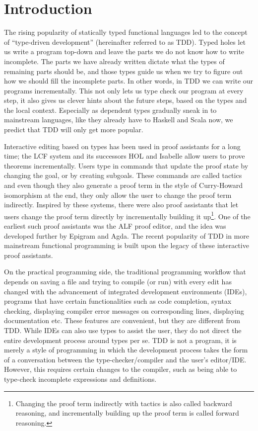 \section{Introduction} \label{sec:introduction}

The rising popularity of statically typed functional languages led to
the concept of ``type-driven development'' (hereinafter referred to as TDD).
Typed holes let us write a program top-down and leave the parts we do not know
how to write incomplete. The parts we have already written dictate what the
types of remaining parts should be, and those types guide us when we try to
figure out how we should fill the incomplete parts.
In other words, in TDD we can write our programs incrementally. This not only
lets us type check our program at every step, it also gives us clever
hints about the future steps, based on the types and the local context.
Especially as dependent types gradually sneak in to mainstream languages, like
they already have to Haskell\cite{eisenberg} and Scala\cite{scalaDep} now, we
predict that TDD will only get more popular.

Interactive editing based on types has been used in proof assistants for a long
time; the LCF system\cite{lcf} and its successors HOL and
Isabelle\cite{isabelle} allow users to prove theorems
incrementally. Users type in commands that update the proof state by
changing the goal, or by creating subgoals. These commands are called
tactics and even though they also generate a proof term in the style
of Curry-Howard isomorphism at the end, they only allow the user to change the
proof term indirectly.
Inspired by these systems, there were also proof assistants that let users
change the proof term directly by incrementally building it
up\footnote{Changing the proof term indirectly with tactics is also called
backward reasoning, and incrementally building up the proof term is called
forward reasoning.}. One of the earliest such proof assistants was the ALF proof
editor\cite{ALF}, and the idea was developed further by Epigram\cite{epigram}
and Agda\cite{agda}.  The recent popularity of TDD in more mainstream
functional programming is built upon the legacy of these interactive proof
assistants.

On the practical programming side, the traditional programming
workflow that depends on saving a file and trying to compile (or run) with
every edit has changed with the advancement of integrated development environments (IDEs),
programs that have certain functionalities such as code completion, syntax
checking, displaying compiler error messages on corresponding lines, displaying
documentation etc. These features are convenient, but they are different from
TDD. While IDEs can also use types to assist the user, they do not direct the
entire development process around types per se. TDD is not a program, it is
merely a style of programming in which the development process takes the form
of a conversation between the type-checker/compiler and the user's editor/IDE.
However, this requires certain changes to the compiler, such as being able to
type-check incomplete expressions and definitions.\cite{tdd}

